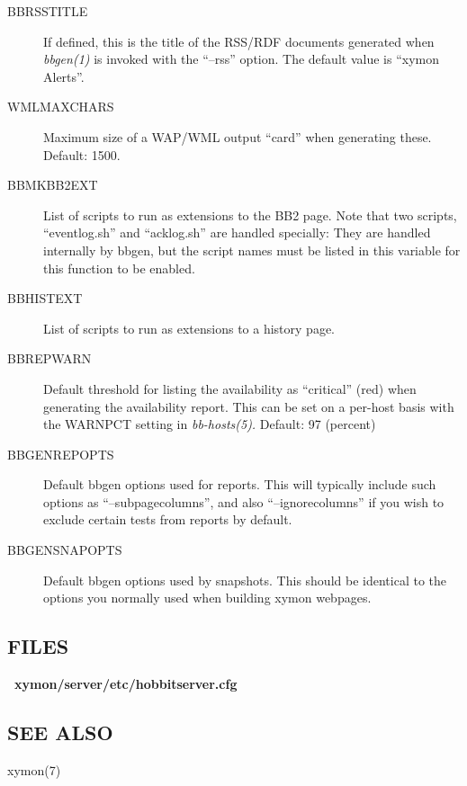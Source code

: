 \begin{description}
 

\item[BBRSSTITLE] If defined, this is the title of the RSS/RDF documents generated when \emph{bbgen(1)}
 is invoked with the ``--rss'' option. The default value is ``xymon Alerts''. 

 

\item[WMLMAXCHARS] Maximum size of a WAP/WML output ``card'' when generating these. Default: 1500. 

 

\item[BBMKBB2EXT] List of scripts to run as extensions to the BB2 page. Note that two scripts, ``eventlog.sh'' and ``acklog.sh'' are handled specially: They are handled internally by bbgen, but the script names must be listed in this variable for this function to be enabled. 

 

\item[BBHISTEXT] List of scripts to run as extensions to a history page. 

 

\item[BBREPWARN] Default threshold for listing the availability as ``critical'' (red) when generating the availability report. This can be set on a per-host basis with the WARNPCT setting in \emph{bb-hosts(5).}
 Default: 97 (percent) 

 

\item[BBGENREPOPTS] Default bbgen options used for reports. This will typically include such options as ``--subpagecolumns'', and also ``--ignorecolumns'' if you wish to exclude certain tests from reports by default. 

 

\item[BBGENSNAPOPTS] Default bbgen options used by snapshots. This should be identical to the options you normally used when building xymon webpages. 

 


\end{description}

\subsection{FILES}
\textbf{~xymon/server/etc/hobbitserver.cfg}


 
\subsection{SEE ALSO}
xymon(7) 

